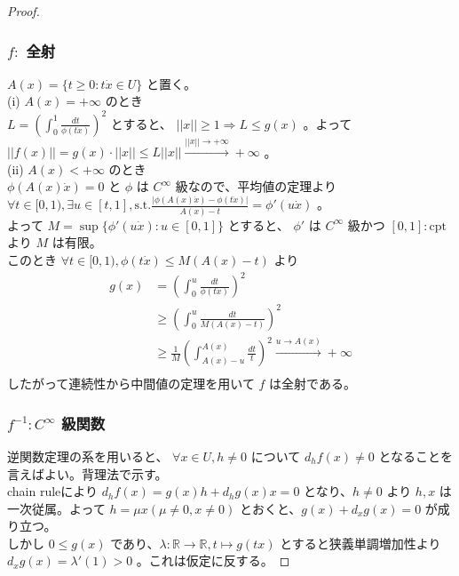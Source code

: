 \documentclass[a4paper,10pt]{jsarticle}
\begin{document}
\begin{proof}
  \subsubsection*{$f:$ 全射}
  $A(x)=\{t \geq 0: t\dot{x} \in U\}$ と置く。 \\
  (i) $A(x)=+\infty$ のとき \\
  $L=(\int_{0}^{1} \frac{dt}{\phi(t\dot{x})})^2$ とすると、 $||x|| \geq 1 \Rightarrow L \leq g(x)$ 。よって $||f(x)||=g(x)\cdot ||x|| \leq L||x||\xrightarrow{||x|| \to +\infty} +\infty$ 。
  \\
  (ii) $A(x)<+\infty$ のとき \\
  $\phi(A(x)\dot{x})=0$ と $\phi$ は $C^\infty$ 級なので、平均値の定理より $\forall t \in [0,1),\exists u \in [t,1],\mbox{s.t.} \frac{|\phi(A(x)\dot{x})-\phi(t\dot{x})|}{A(x)-t}=\phi'(u\dot{x})$ 。 \\
  よって $M=\sup\{\phi'(u\dot{x}):u \in [0,1]\}$ とすると、 $\phi'$ は $C^\infty$ 級かつ $[0,1]:\mbox{cpt}$ より $M$ は有限。 \\
  このとき $\forall t \in [0,1),\phi(t\dot{x}) \leq M(A(x)-t)$ より
  \begin{align*}
    g(x) &=(\int_{0}^{u} \frac{dt}{\phi(t\dot{x})})^2 \\
    & \geq (\int_{0}^{u} \frac{dt}{M(A(x)-t)})^2 \\
    & \geq \frac{1}{M} (\int_{A(x)-u}^{A(x)} \frac{dt}{t})^2 \xrightarrow{u \to A(x)} +\infty \\
  \end{align*}
  したがって連続性から中間値の定理を用いて $f$ は全射である。

  \subsubsection*{$f^{-1}:C^\infty$ 級関数}
  逆関数定理の系を用いると、 $\forall x \in U,h \neq 0$ について $d_hf(x) \neq 0$ となることを言えばよい。背理法で示す。 \\
  chain ruleにより $d_hf(x)=g(x)h+d_hg(x)x=0$ となり、$h \neq 0$ より $h,x$ は一次従属。よって $h=\mu x(\mu \neq 0,x \neq 0)$ とおくと、$g(x)+d_xg(x)=0$ が成り立つ。 \\
  しかし $0 \leq g(x)$ であり、$\lambda:\mathbb{R} \to \mathbb{R},t \mapsto g(tx)$ とすると狭義単調増加性より $d_xg(x)=\lambda'(1)>0$ 。これは仮定に反する。
\end{proof}
\end{document}
